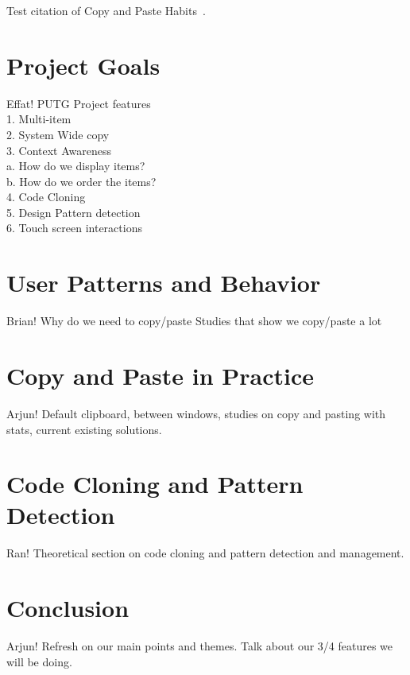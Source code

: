 \documentclass{acm_proc_article-sp}
\begin{document}
Test citation of Copy and Paste Habits~\cite{cpHabits}.

\section{Project Goals}
Effat!
PUTG
Project features
\\
1. Multi-item\\
2. System Wide copy\\
3. Context Awareness\\
    a. How do we display items?\\
    b. How do we order the items?\\
4. Code Cloning   \\
5. Design Pattern detection\\ 
6. Touch screen interactions\\

\section{User Patterns and Behavior}
Brian!
Why do we need to copy/paste
Studies that show we copy/paste a lot

\section{Copy and Paste in Practice}
Arjun!
Default clipboard, between windows, studies on copy and pasting with stats, current existing solutions.

\section{Code Cloning and Pattern Detection}
Ran!
Theoretical section on code cloning and pattern detection and management.

\section{Conclusion}
Arjun!
Refresh on our main points and themes. Talk about our 3/4 features we will be doing.




\end{document}
